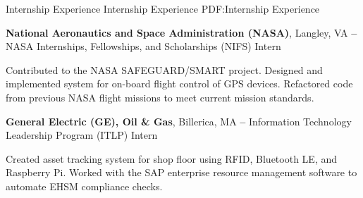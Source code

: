 \Section
{Internship Experience}
{Internship Experience}
{PDF:Internship Experience}

\Entry
\textbf{National Aeronautics and Space Administration (NASA)},
Langley, VA
\dotfill
\textbf{ -- }
\Gap
NASA Internships, Fellowships, and Scholarships (NIFS) Intern
\begin{Detail}
    \SubBulletItem
    Contributed to the NASA SAFEGUARD/SMART project.
    \SubBulletItem
    Designed and implemented system for on-board flight control of GPS devices.
    \SubBulletItem
    Refactored code from previous NASA flight missions to meet current mission standards.
\end{Detail}

\Entry
\BigGap
\textbf{General Electric (GE), Oil \& Gas},
Billerica, MA
\dotfill
\textbf{ --
}
\Gap
Information Technology Leadership Program (ITLP) Intern
\begin{Detail}
    \SubBulletItem
    Created asset tracking system for shop floor using RFID, Bluetooth LE, and Raspberry Pi.
    \SubBulletItem
    Worked with the SAP enterprise resource management software to automate EHSM compliance checks.
\end{Detail}
